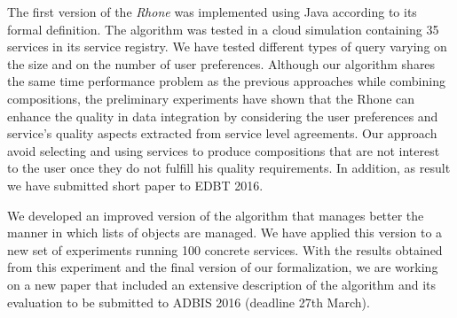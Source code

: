\documentclass[11pt,a4paper,oneside]{report}
\begin{document}
The first version of the \textit{Rhone} was implemented using Java according to its formal definition. The algorithm was tested in a cloud simulation containing 35 services in its service registry. We have tested different types of query varying on the size and on the number of user preferences. Although our algorithm shares the same time performance problem as the previous approaches while combining compositions, the preliminary experiments have shown that the Rhone can enhance the quality in data integration by considering the user preferences and service’s quality aspects extracted from service level agreements. Our approach avoid selecting and using services to produce compositions that are not interest to the user once they do not fulfill his quality requirements. In addition, as result we have submitted short paper to EDBT 2016. 

We developed an improved version of the algorithm that manages better the manner in which lists of objects are managed. We have applied this version to a new set of experiments running 100 concrete services. With the results obtained from this experiment and the final version of our formalization, we are working on a new paper that included an extensive description of the algorithm and its evaluation to be submitted to ADBIS 2016 (deadline 27th March).

\end{document}
